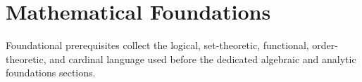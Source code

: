 \part{Mathematical Foundations}

Foundational prerequisites collect the logical, set-theoretic, functional, order-theoretic, and cardinal language used before the dedicated algebraic and analytic foundations sections.








